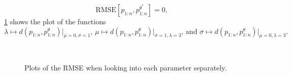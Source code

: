 \documentclass[10pt]{article}
\begin{document}
$$
\text{RMSE}\left[p_{1:n}, p^{\theta^\ast}_{1:n}\right] = 0, 
$$
\cref{fig:rmse_pure_premium} shows the plot of the functions 
$$
\lambda\mapsto d\left(p_{1:n},p_{1:n}^{\theta}\right)\Big\rvert_{\mu =0, \sigma = 1}\text{, }\mu\mapsto d\left(p_{1:n},p_{1:n}^{\theta}\right)\Big\rvert_{\sigma =1, \lambda = 3}\text{, and }\sigma\mapsto d\left(p_{1:n},p_{1:n}^{\theta}\right)\big\rvert_{\mu =0, \lambda = 3}.
$$

\begin{figure}[!ht]
  \begin{center}
    \\
    \caption{Plots of the RMSE when looking into each parameter separately.}
    \label{fig:rmse_pure_premium}
  \end{center}
\end{figure}
\end{document}
